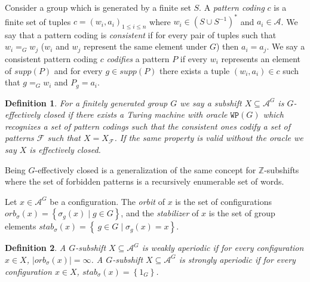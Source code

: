 \documentclass[letterpaper]{amsart}
\theoremstyle{plain}
\newtheorem{definition}{Definition}[section]
\def\ZZ{\mathbb{Z}}
\def\ag{\mathcal{A}}
\def\FF{\mathcal{F}}
\newcommand{\define}[1]{\emph{#1}}
\newcommand{\cor}[2][]{#2}
\begin{document}
	Consider a group which is generated by a finite set $S$. A \define{pattern coding} $c$ is a finite set of tuples $c=(w_i,a_i)_{1 \leq i \leq n}$ where $w_i \in (S \cup S^{-1})^{*}$ and $a_i \in \ag$. We say that a pattern coding is \define{consistent} if for every pair of tuples such that $w_i =_G w_j$ ($w_i$ and $w_j$ represent the same element under $G$) then $a_i = a_j$. We say a consistent pattern coding $c$ \define{codifies} a pattern $P$ if every $w_i$ represents an element of $supp(P)$ and for every $g \in supp(P)$ there exists a tuple $(w_i,a_i) \in c$ such that $g =_G w_i$ and $P_g = a_i$.
	
	\begin{definition}
		For a finitely generated group $G$ we say a subshift $X\subseteq \ag^G$ is \define{$G$-effectively closed} if there exists a Turing machine with oracle $\texttt{WP}(G)$ which recognizes a set of pattern codings such that the consistent ones codify a set of patterns $\FF$ such that $X=X_\FF$. If the same property is valid without the oracle we say $X$ is \define{effectively closed}.
	\end{definition}
	
	Being $G$-effectively closed is a generalization of the same concept for $\ZZ$-subshifts where the set of forbidden patterns is a recursively enumerable set of words. 
	
	
	Let $x\in \ag^G$ be a configuration. The \define{orbit} of $x$ is the set of configurations $orb_\sigma(x)=\left\{\sigma_g(x)\mid g\in G \right\}$, and the \define{stabilizer} of $x$ is the set of group elements $stab_\sigma(x)=\left\{\ g\in G\mid \sigma_g(x)=x\right\}$. \cor[In the context of subshifts, the stabilizer is a normal subgroup of $G$.]{}
	
	\begin{definition}
		A $G$-subshift $X\subseteq \ag^G$ is \define{weakly aperiodic} if for every configuration $x\in X$, $|orb_\sigma(x)|=\infty$. A $G$-subshift $X\subseteq \ag^G$ is \define{strongly aperiodic} if for every configuration $x\in X$, $stab_\sigma(x)=\left\{ 1_G\right\}$.
	\end{definition}
	
\end{document}
